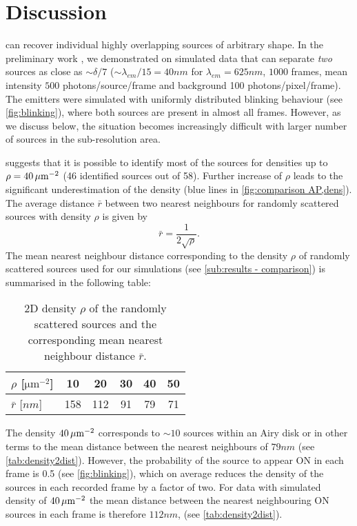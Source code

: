 

\section{Discussion\label{sec:Discussion}}

\inmf{} can recover individual highly overlapping sources of arbitrary shape. In the preliminary work \cite{Mandula2010b}, we demonstrated on simulated data that \inmf{} can separate \emph{two} sources as close as $\sim \delta/7$ ($\sim \lambda_{em}/15 = 40 \unit{nm}$ for $\lambda_{em}=625 \unit{nm}$, $1000$ frames, mean intensity $500$ photons/source/frame and background 100 photons/pixel/frame). The emitters were simulated with uniformly distributed blinking behaviour (see \autoref{fig:blinking}\aaa), where both sources are present in almost all frames. However, as we discuss below, the situation becomes increasingly difficult with larger number of sources in the sub-resolution area.

 suggests that it is possible to identify most of the sources for densities up to $\rho=40\, \mathrm{\mu m}^{-2}$ (46 identified sources out of 58). Further increase of $\rho$ leads to the significant underestimation of the density (blue lines in \autoref{fig:comparison AP,dens}\aaa). The average distance $\bar{r}$ between two nearest neighbours for randomly scattered sources with density $\rho$ is given by \cite{Frieden1991}
%
\begin{equation}
	\bar{r}=\frac{1}{2\sqrt{\rho}}.
\end{equation}
%
The mean nearest neighbour distance corresponding to the density $\rho$ of randomly scattered sources used for our simulations (see \autoref{sub:results - comparison}) is summarised in the following table:
%
\begin{table}[!h]
	\centering
	\begin{tabular}{l|ccccc}
		$\rho$ [$\unit{\um^{-2}}$]		& 10		& 20		& 30		& 40		& 50\\ \hline
		$\bar{r}$ [$\unit{nm}$]		& 158	& 112	& 91		& 79		& 71
	\end{tabular}
	\caption{2D density $\rho$ of the randomly scattered sources and the corresponding mean nearest neighbour distance $\bar{r}$.\label{tab:density2dist}}
\end{table}

The density $40\, \mathrm{\mu m}^{-2}$ corresponds to $\sim 10$ sources within an Airy disk or in other terms to the mean distance between the nearest neighbours of $79\unit{nm}$ (see \autoref{tab:density2dist}). However, the probability of the source to appear ON in each frame is 0.5 (see \autoref{fig:blinking}\ddd), which on average reduces the density of the sources in each recorded frame by a factor of two. For data with simulated density of $40\, \mathrm{\mu m}^{-2}$ the mean distance between the nearest neighbouring ON sources in each frame is therefore $112 \unit{nm}$, (see \autoref{tab:density2dist}).  

